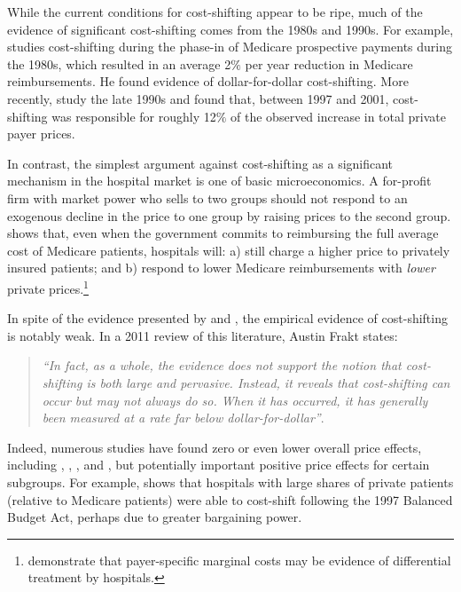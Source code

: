 \documentclass[12pt]{article}
\begin{document}
While the current conditions for cost-shifting appear to be ripe, much of the evidence of significant cost-shifting comes from the 1980s and 1990s.  For example, \cite{cutler1998costshift} studies cost-shifting during the phase-in of Medicare prospective payments during the 1980s, which resulted in an average 2$\%$ per year reduction in Medicare reimbursements.  He found evidence of dollar-for-dollar cost-shifting.  More recently, \cite{zwanziger2006} study the late 1990s and found that, between 1997 and 2001, cost-shifting was responsible for roughly 12$\%$ of the observed increase in total private payer prices.

In contrast, the simplest argument against cost-shifting as a significant mechanism in the hospital market is one of basic microeconomics.  A for-profit firm with market power who sells to two groups should not respond to an exogenous decline in the price to one group by raising prices to the second group.  \cite{hay1983} shows that, even when the government commits to reimbursing the full average cost of Medicare patients, hospitals will: a) still charge a higher price to privately insured patients; and b) respond to lower Medicare reimbursements with \textit{lower} private prices.\footnote{\cite{dor1996} demonstrate that payer-specific marginal costs may be evidence of differential treatment by hospitals.}

In spite of the evidence presented by \cite{cutler1998costshift} and \cite{zwanziger2006}, the empirical evidence of cost-shifting is notably weak.  In a 2011 review of this literature, Austin Frakt states:
\begin{quote}
\textit{``In fact, as a whole, the
evidence does not support the notion that cost-shifting is both large and
pervasive. Instead, it reveals that cost-shifting can occur but may not
always do so. When it has occurred, it has generally been measured at a
rate far below dollar-for-dollar''}.
\end{quote}

Indeed, numerous studies have found zero or even lower overall price effects, including \cite{dranove2008impact}, \cite{wu2010}, \cite{frakt2014}, and \cite{dranove2017}, but potentially important positive price effects for certain subgroups.  For example, \cite{wu2010} shows that hospitals with large shares of private patients (relative to Medicare patients) were able to cost-shift following the 1997 Balanced Budget Act, perhaps due to greater bargaining power.
\end{document}
